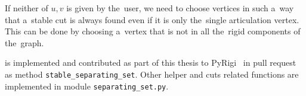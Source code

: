If neither of \( u, v \) is given by the~user,
we need to choose vertices in such a~way
that a~stable cut is always found even if it is only the~single articulation vertex.
This can be done by choosing a~vertex that is not in all the~rigid components of the~graph.

%
is implemented and contributed as part of this thesis
to PyRigi~\cite{pyrigi} in pull request~\cite{pyrigi_pr_stable_cuts}
as method \texttt{stable\_separating\_set}.
Other helper and cuts related functions
are implemented in module \texttt{separating\_set.py}.

